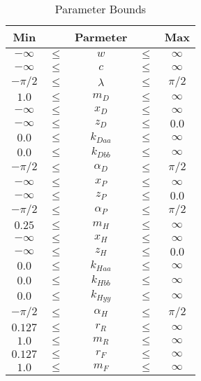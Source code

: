 \documentclass{bmd2019a}
\begin{document}
\begin{table}
  \caption{Parameter Bounds}
  \begin{tabular}{ccccc}
    \toprule
    Min & & Parmeter & & Max\\
    \midrule
    $-\infty$ & $\leq$ & $w       $  &  $\leq$  &  $\infty$ \\
    $-\infty$ & $\leq$ & $c       $  &  $\leq$  &  $\infty$ \\
    $-\pi/2 $ & $\leq$ & $\lambda $  &  $\leq$  &  $\pi/2$ \\
    $1.0    $ & $\leq$ & $m_D     $  &  $\leq$  &  $\infty$ \\
    $-\infty$ & $\leq$ & $x_D     $  &  $\leq$  &  $\infty$ \\
    $-\infty$ & $\leq$ & $z_D     $  &  $\leq$  &  $0.0$    \\
    $0.0    $ & $\leq$ & $k_{Daa} $  &  $\leq$  &  $\infty$ \\
    $0.0    $ & $\leq$ & $k_{Dbb} $  &  $\leq$  &  $\infty$ \\
    $-\pi/2 $ & $\leq$ & $\alpha_D$  &  $\leq$  &  $\pi/2$  \\
    $-\infty$ & $\leq$ & $x_P     $  &  $\leq$  &  $\infty$ \\
    $-\infty$ & $\leq$ & $z_P     $  &  $\leq$  &  $0.0$    \\
    $-\pi/2 $ & $\leq$ & $\alpha_P$  &  $\leq$  &  $\pi/2$ \\
    $0.25   $ & $\leq$ & $m_H     $  &  $\leq$  &  $\infty$ \\
    $-\infty$ & $\leq$ & $x_H     $  &  $\leq$  &  $\infty$ \\
    $-\infty$ & $\leq$ & $z_H     $  &  $\leq$  &  $0.0$ \\
    $0.0    $ & $\leq$ & $k_{Haa} $  &  $\leq$  &  $\infty$ \\
    $0.0    $ & $\leq$ & $k_{Hbb} $  &  $\leq$  &  $\infty$ \\
    $0.0    $ & $\leq$ & $k_{Hyy} $  &  $\leq$  &  $\infty$ \\
    $-\pi/2 $ & $\leq$ & $\alpha_H$  &  $\leq$  &  $\pi/2$ \\
    $0.127  $ & $\leq$ & $r_R     $  &  $\leq$  &  $\infty$ \\
    $1.0    $ & $\leq$ & $m_R     $  &  $\leq$  &  $\infty$ \\
    $0.127  $ & $\leq$ & $r_F     $  &  $\leq$  &  $\infty$ \\
    $1.0    $ & $\leq$ & $m_F     $  &  $\leq$  &  $\infty$ \\
    \bottomrule
  \end{tabular}
\end{table}
\end{document}
